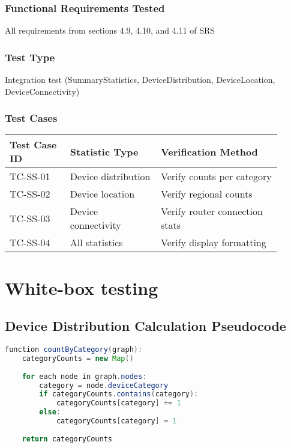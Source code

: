 \documentclass{scrreprt}
\begin{document}
\subsection{Functional Requirements Tested}
All requirements from sections 4.9, 4.10, and 4.11 of SRS

\subsection{Test Type}
Integration test (SummaryStatistics, DeviceDistribution, DeviceLocation, DeviceConnectivity)

\subsection{Test Cases}
\begin{table}[h!]
\centering
\begin{tabular}{|p{0.2\linewidth}|p{0.3\linewidth}|p{0.4\linewidth}|}
    \hline
    Test Case ID & Statistic Type & Verification Method \\
    \hline
    TC-SS-01 & Device distribution & Verify counts per category \\
    \hline
    TC-SS-02 & Device location & Verify regional counts \\
    \hline
    TC-SS-03 & Device connectivity & Verify router connection stats \\
    \hline
    TC-SS-04 & All statistics & Verify display formatting \\
    \hline
\end{tabular}
\end{table}

\chapter{White-box testing}

\section{Device Distribution Calculation Pseudocode}
\begin{lstlisting}[language=Java,frame=single]
function countByCategory(graph):
    categoryCounts = new Map()
    
    for each node in graph.nodes:
        category = node.deviceCategory
        if categoryCounts.contains(category):
            categoryCounts[category] += 1
        else:
            categoryCounts[category] = 1
    
    return categoryCounts
\end{lstlisting}
\end{document}
